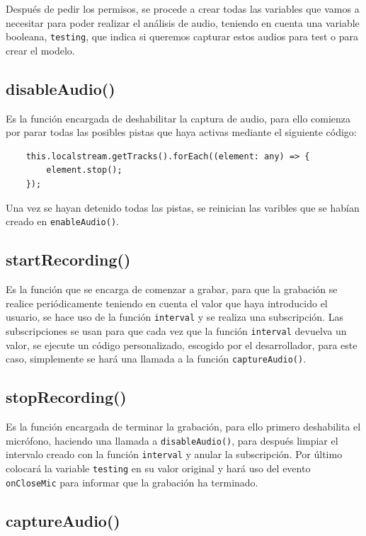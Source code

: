\documentclass[a4paper, 12pt]{book}
\begin{document}
Después de pedir los permisos, se procede a crear todas las variables que vamos a necesitar para poder realizar el análisis de audio, teniendo en cuenta una variable booleana, \texttt{testing}, que indica si queremos capturar estos audios para test o para crear el modelo.

\subsection*{disableAudio()}

Es la función encargada de deshabilitar la captura de audio, para ello comienza por parar todas las posibles pistas que haya activas mediante el siguiente código:

{\footnotesize
\begin{verbatim}
	this.localstream.getTracks().forEach((element: any) => {
		element.stop();
	});
\end{verbatim}
}

Una vez se hayan detenido todas las pistas, se reinician las varibles que se habían creado en \texttt{enableAudio()}.

\subsection*{startRecording()}

Es la función que se encarga de comenzar a grabar, para que la grabación se realice periódicamente teniendo en cuenta el valor que haya introducido el usuario, se hace uso de la función \texttt{interval} y se realiza una subscripción. Las subscripciones se usan para que cada vez que la función \texttt{interval} devuelva un valor, se ejecute un código personalizado, escogido por el desarrollador, para este caso, simplemente se hará una llamada a la función \texttt{captureAudio()}.

\subsection*{stopRecording()}

Es la función encargada de terminar la grabación, para ello primero deshabilita el micrófono, haciendo una llamada a \texttt{disableAudio()}, para después limpiar el intervalo creado con la función \texttt{interval} y anular la subscripción. Por último colocará la variable \texttt{testing} en su valor original y hará uso del evento \texttt{onCloseMic} para informar que la grabación ha terminado.

\subsection*{captureAudio()}
\end{document}
